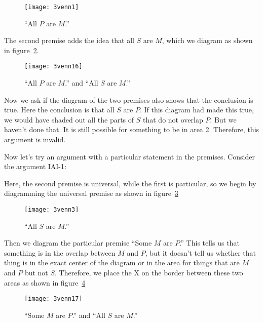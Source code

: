 \begin{figure}[!ht]\centering
\texttt{[image: 3venn1]}
\caption{``All $P$ are $M$.''}
\label{fig:allparem}
\end{figure}

The second premise adds the idea that all $S$ are $M$, which we diagram as shown in figure~\ref{fig:venninvalidexample}.

\begin{figure}[!ht]\centering
\texttt{[image: 3venn16]}
\caption{``All $P$ are $M$.'' and ``All $S$ are $M$.''}
\label{fig:venninvalidexample}
\end{figure}

Now we ask if the diagram of the two premises also shows that the conclusion is true. Here the conclusion is that all $S$ are $P$. If this diagram had made this true, we would have shaded out all the parts of $S$ that do not overlap $P$. But we haven't done that. It is still possible for something to be in area 2. Therefore, this argument is invalid.

\newpage

Now let's try an argument with a particular statement in the premises. Consider the argument IAI-1:

\begin{kormanize}
\end{kormanize}

Here, the second premise is universal, while the first is particular, so we begin by diagramming the universal premise as shown in figure~\ref{fig:vennallsarem}

\begin{figure}[!ht]\centering
\texttt{[image: 3venn3]}
\caption{``All $S$ are $M$.''}
\label{fig:vennallsarem}
\end{figure}

Then we diagram the particular premise ``Some $M$ are $P$.'' This tells us that something is in the overlap between $M$ and $P$, but it doesn't tell us whether that thing is in the exact center of the diagram or in the area for things that are $M$ and $P$ but not $S$. Therefore, we place the X on the border between these two areas as shown in figure~\ref{fig:venninvalidpart}

\begin{figure}[!ht]\centering
\texttt{[image: 3venn17]}
\caption{``Some $M$ are $P$.'' and ``All $S$ are $M$.''}
\label{fig:venninvalidpart}
\end{figure}

